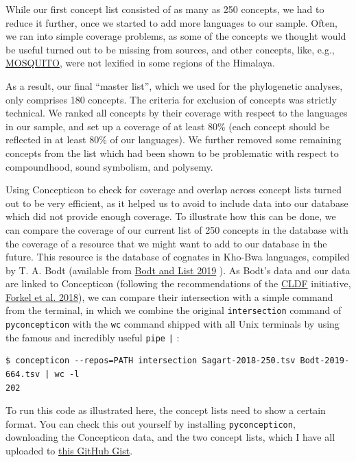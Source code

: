 \documentclass[
  a4paper,
  14pt,
  oneside,
  tablecaptionabove
]{scrbook}
\newcommand{\passthrough}[1]{#1}
\begin{document}
While our first concept list consisted of as many as 250 concepts, we
had to reduce it further, once we started to add more languages to our
sample. Often, we ran into simple coverage problems, as some of the
concepts we thought would be useful turned out to be missing from
sources, and other concepts, like, e.g.,
\href{https://concepticon.clld.org/parameters/1509}{MOSQUITO}, were not
lexified in some regions of the Himalaya.

As a result, our final \enquote{master list}, which we used for the
phylogenetic analyses, only comprises 180 concepts. The criteria for
exclusion of concepts was strictly technical. We ranked all concepts by
their coverage with respect to the languages in our sample, and set up a
coverage of at least 80\% (each concept should be reflected in at least
80\% of our languages). We further removed some remaining concepts from
the list which had been shown to be problematic with respect to
compoundhood, sound symbolism, and polysemy.

Using Concepticon to check for coverage and overlap across concept lists
turned out to be very efficient, as it helped us to avoid to include
data into our database which did not provide enough coverage. To
illustrate how this can be done, we can compare the coverage of our
current list of 250 concepts in the database with the coverage of a
resource that we might want to add to our database in the future. This
resource is the database of cognates in Kho-Bwa languages, compiled by
T. A. Bodt (available from
\href{http://bibliography.lingpy.org?key=Bodt2019}{Bodt and List 2019}
). As Bodt's data and our data are linked to Concepticon (following the
recommendations of the \href{https://cldf.clld.org}{CLDF} initiative,
\href{http://bibliography.lingpy.org?key=Forkel2018a}{Forkel et al.
2018}), we can compare their intersection with a simple command from
the terminal, in which we combine the original
\passthrough{\lstinline!intersection!} command of
\passthrough{\lstinline!pyconcepticon!} with the
\passthrough{\lstinline!wc!} command shipped with all Unix terminals by
using the famous and incredibly useful \passthrough{\lstinline!pipe!}
\passthrough{\lstinline!|!} :

\begin{lstlisting}
$ concepticon --repos=PATH intersection Sagart-2018-250.tsv Bodt-2019-664.tsv | wc -l
202
\end{lstlisting}

To run this code as illustrated here, the concept lists need to show a
certain format. You can check this out yourself by installing
\passthrough{\lstinline!pyconcepticon!}, downloading the Concepticon
data, and the two concept lists, which I have all uploaded to
\href{https://gist.github.com/LinguList/fa93b0829fede0d6cbb01f4ca5f5b864}{this
GitHub Gist}.
\end{document}
